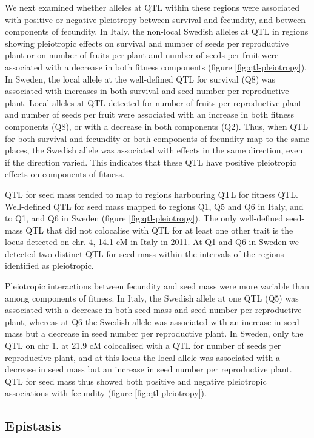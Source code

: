 \documentclass[12pt,]{article}
\begin{document}
We next examined whether alleles at QTL within these regions were associated with positive or negative pleiotropy between survival and fecundity, and between components of fecundity.
In Italy, the non-local Swedish alleles at QTL in regions showing pleiotropic effects on survival and number of seeds per reproductive plant or on number of fruits per plant and number of seeds per fruit were associated with a decrease in both fitness components (figure \ref{fig:qtl-pleiotropy}).
In Sweden, the local allele at the well-defined QTL for survival (Q8) was associated with increases in both survival and seed number per reproductive plant.
Local alleles at QTL detected for number of fruits per reproductive plant and number of seeds per fruit were associated with an increase in both fitness components (Q8), or with a decrease in both components (Q2).
Thus, when QTL for both survival and fecundity or both components of fecundity map to the same places, the Swedish allele was associated with effects in the same direction, even if the direction varied.
This indicates that these QTL have positive pleiotropic effects on components of fitness.

QTL for seed mass tended to map to regions harbouring QTL for fitness QTL.
Well-defined QTL for seed mass mapped to regions Q1, Q5 and Q6 in Italy, and to Q1, and Q6 in Sweden (figure \ref{fig:qtl-pleiotropy}).
The only well-defined seed-mass QTL that did not colocalise with QTL for at least one other trait is the locus detected on chr. 4, 14.1 cM in Italy in 2011.
At Q1 and Q6 in Sweden we detected two distinct QTL for seed mass within the intervals of the regions identified as pleiotropic.

Pleiotropic interactions between fecundity and seed mass were more variable than among components of fitness.
In Italy, the Swedish allele at one QTL (Q5) was associated with a decrease in both seed mass and seed number per reproductive plant, whereas at Q6 the Swedish allele was associated with an increase in seed mass but a decrease in seed number per reproductive plant.
In Sweden, only the QTL on chr 1. at 21.9 cM colocalised with a QTL for number of seeds per reproductive plant, and at this locus the local allele was associated with a decrease in seed mass but an increase in seed number per reproductive plant.
QTL for seed mass thus showed both positive and negative pleiotropic associations with fecundity (figure \ref{fig:qtl-pleiotropy}).

\hypertarget{epistasis}{%
\subsection{Epistasis}\label{epistasis}}
\end{document}
